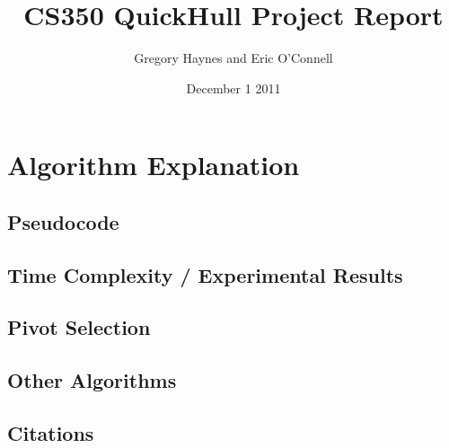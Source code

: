 \documentclass[11pt]{article}
\title{CS350 QuickHull Project Report}
\author{Gregory Haynes and Eric O'Connell}
\date{December 1 2011}
\begin{document}
\maketitle

\section{Algorithm Explanation}

\subsection{Pseudocode}

\subsection{Time Complexity / Experimental Results}

\subsection{Pivot Selection}

\subsection{Other Algorithms}

\subsection{Citations}
\end{document}
